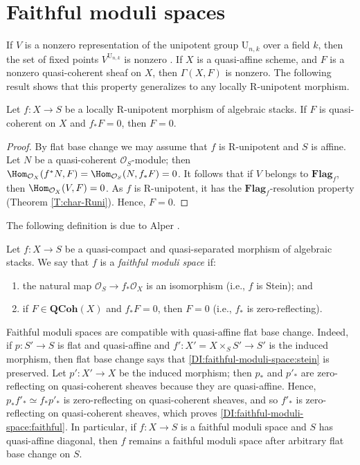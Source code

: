 \documentclass[reqno,a4paper]{amsart}
\numberwithin{Theorem}{section}
\newcommand{\Orb}{\mathcal{O}}
\newcommand{\QCoh}{\mathbf{QCoh}}
\renewcommand{\U}{\mathrm{U}}
\newcommand{\Flag}{\mathbf{Flag}}
\theoremstyle{plain}
\theoremstyle{remark}
\begin{document}
\section{Faithful moduli spaces}\label{S:faithful}
If $V$ is a nonzero representation of the unipotent group $\U_{n,k}$
over a field $k$, then the set of fixed points $V^{\U_{n,k}}$ is
nonzero \cite[XVII, Prop.\ 3.2]{SGA3-II-NEW}. If $X$ is a quasi-affine
scheme, and $F$ is a nonzero quasi-coherent sheaf on $X$, then
$\Gamma(X,F)$ is nonzero. The following result shows that this
property generalizes to any locally R-unipotent morphism.
\begin{proposition}\label{prop:pushforward is faithful on objects}
  Let $f\colon X\to S$ be a locally R-unipotent morphism of algebraic
  stacks. If $F$ is quasi-coherent on $X$ and $f_*F=0$, then $F=0$.
\end{proposition}
\begin{proof}
  By flat base change we may assume that $f$ is R-unipotent and $S$ is
  affine. Let $N$ be a quasi-coherent $\Orb_S$-module; then
  $\Hom_{\Orb_X}(f^*N,F) = \Hom_{\Orb_S}(N,f_*F) = 0$.  It follows
  that if $V$ belongs to $\Flag_f$, then 
  $\Hom_{\Orb_X}(V,F)=0$. As $f$ is R-unipotent, it has the
  $\Flag_f$-resolution property (Theorem \ref{T:char-Runi}). Hence, $F=0$.
\end{proof} 
The following definition is due to Alper \cite{Jarod-faithful}.
\begin{definition}\label{D:faithful-moduli-space}
  Let $f\colon X \to S$ be a quasi-compact and quasi-separated
  morphism of algebraic stacks. We say that $f$ is a \emph{faithful moduli space} if:
\begin{enumerate}
\item \label{DI:faithful-moduli-space:stein} the natural map $\Orb_S \to f_*\Orb_X$ is an isomorphism (i.e., $f$ is Stein); and
\item \label{DI:faithful-moduli-space:faithful} if $F \in \QCoh(X)$ and $f_*F = 0$, then $F=0$
  (i.e., $f_*$ is zero-reflecting).
\end{enumerate}   
\end{definition}
\begin{remark}\label{R:faith-flat-bc}
  Faithful moduli spaces are compatible with quasi-affine flat base
  change. Indeed, if $p \colon S' \to S$ is flat and quasi-affine and
  $f'\colon X'=X\times_S S' \to S'$ is the induced morphism, then flat
  base change says that \eqref{DI:faithful-moduli-space:stein} is
  preserved. Let $p' \colon X'\to X$ be the induced morphism; then
  $p_*$ and $p'_*$ are zero-reflecting on quasi-coherent sheaves because
  they are quasi-affine. Hence, $p_*f'_*\simeq f_*p'_*$ is
  zero-reflecting on quasi-coherent sheaves, and so $f'_*$ is
  zero-reflecting on quasi-coherent sheaves, which proves
  \eqref{DI:faithful-moduli-space:faithful}.  In particular, if
  $f\colon X \to S$ is a faithful moduli space and $S$ has
  quasi-affine diagonal, then $f$ remains a faithful moduli space
  after arbitrary flat base change on $S$.
\end{remark}
\end{document}
